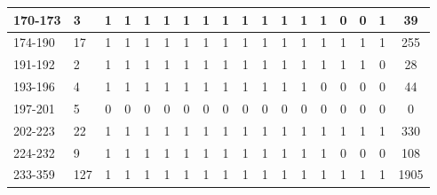 \begin{table}[htbp]
\begin{center}
{\begin{tabular}{|l|l|c|c|c|c|c|c|c|c|c|c|c|c|c|c|c|c|}
                170-173                                   & 3                                               & 1          & 1          & 1          & 1          & 1          & 1          & 1          & 1          & 1          & 1          & 1          & 1          & 0          & 0          & 1          & 39           \\ \hline
                174-190                                   & 17                                              & 1          & 1          & 1          & 1          & 1          & 1          & 1          & 1          & 1          & 1          & 1          & 1          & 1          & 1          & 1          & 255          \\ \hline
                191-192                                   & 2                                               & 1          & 1          & 1          & 1          & 1          & 1          & 1          & 1          & 1          & 1          & 1          & 1          & 1          & 1          & 0          & 28           \\ \hline
                193-196                                   & 4                                               & 1          & 1          & 1          & 1          & 1          & 1          & 1          & 1          & 1          & 1          & 1          & 0          & 0          & 0          & 0          & 44           \\ \hline
                197-201                                   & 5                                               & 0          & 0          & 0          & 0          & 0          & 0          & 0          & 0          & 0          & 0          & 0          & 0          & 0          & 0          & 0          & 0            \\ \hline
                202-223                                   & 22                                              & 1          & 1          & 1          & 1          & 1          & 1          & 1          & 1          & 1          & 1          & 1          & 1          & 1          & 1          & 1          & 330          \\ \hline
                224-232                                   & 9                                               & 1          & 1          & 1          & 1          & 1          & 1          & 1          & 1          & 1          & 1          & 1          & 1          & 0          & 0          & 0          & 108          \\ \hline
                233-359                                   & 127                                             & 1          & 1          & 1          & 1          & 1          & 1          & 1          & 1          & 1          & 1          & 1          & 1          & 1          & 1          & 1          & 1905         \\ \hline

\end{tabular}}
\end{center}
\end{table}
